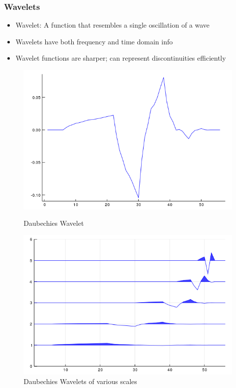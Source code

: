 \documentclass[aspectratio=169]{beamer}
\begin{document}
\begin{frame}
\frametitle{Wavelets}
    \begin{itemize}
        \item Wavelet: A function that resembles a single oscillation of a wave
        \item Wavelets have both frequency and time domain info
        \item Wavelet functions are sharper; can represent discontinuities efficiently
    \end{itemize}
    
\begin{figure}
    \centering
    \begin{minipage}[b]{0.45\textwidth}
        \includegraphics[width=\textwidth]{daub.png}
        \caption{Daubechies Wavelet}
    \end{minipage}
     \hfill
    \begin{minipage}[b]{0.45\textwidth}
        \includegraphics[width=\textwidth]{daub_wiggle.png}
        \caption{Daubechies Wavelets of various scales}
     \end{minipage}
\end{figure}
\end{frame}
\end{document}
